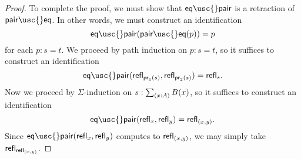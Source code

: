 \begin{proof}
To complete the proof, we must show that $\mathsf{eq\usc{}pair}$ is a retraction of $\mathsf{pair\usc{}eq}$. In other words, we must construct an identification
\begin{equation*}
\mathsf{eq\usc{}pair}(\mathsf{pair\usc{}eq}(p))=p
\end{equation*}
for each $p:s=t$. We proceed by path induction on $p:s=t$, so it suffices to construct an identification 
\begin{equation*}
\mathsf{eq\usc{}pair}\pairr{\refl{\proj 1(s)},\refl{\proj 2(s)}}=\refl{s}.
\end{equation*}
Now we proceed by $\Sigma$-induction on $s:\sm{x:A}B(x)$, so it suffices to construct an identification
\begin{equation*}
\mathsf{eq\usc{}pair}\pairr{\refl{x},\refl{y}}=\refl{(x,y)}.
\end{equation*}
Since $\mathsf{eq\usc{}pair}\pairr{\refl{x},\refl{y}}$ computes to $\mathsf{refl}_{(x,y)}$, we may simply take $\mathsf{refl}_{\mathsf{refl}_{(x,y)}}$.
\end{proof}


